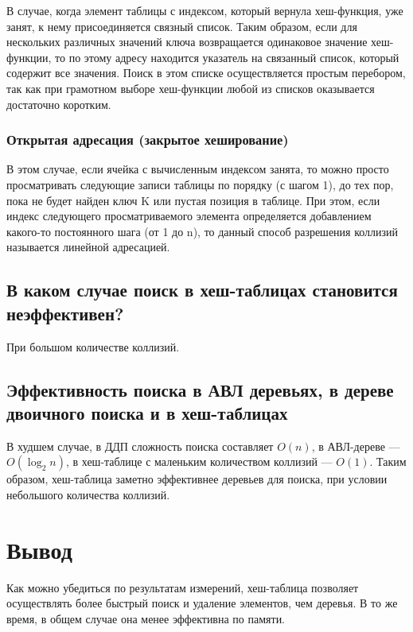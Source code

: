 \documentclass[a4paper,12pt]{extarticle}
\begin{document}
В случае, когда элемент таблицы с индексом, который вернула хеш-функция, уже занят, к нему присоединяется связный список. Таким образом, если для нескольких различных значений ключа возвращается одинаковое значение хеш-функции, то по этому адресу находится указатель на связанный список, который содержит все значения. Поиск в этом списке осуществляется простым перебором, так как при грамотном выборе хеш-функции любой из списков оказывается достаточно коротким.
	
\subsubsection{Открытая адресация (закрытое хеширование)}

В этом случае, если ячейка с вычисленным индексом занята, то можно просто просматривать следующие записи таблицы по порядку (с шагом 1), до тех пор, пока не будет найден ключ K или пустая позиция в таблице. При этом, если индекс следующего просматриваемого элемента определяется добавлением какого-то постоянного шага (от 1 до n), то данный способ разрешения коллизий называется линейной адресацией.

\subsection{В каком случае поиск в хеш-таблицах становится неэффективен?}

При большом количестве коллизий.

\subsection{Эффективность поиска в АВЛ деревьях, в дереве двоичного поиска и в хеш-таблицах}

В худшем случае, в ДДП сложность поиска составляет $O(n)$, в АВЛ-дереве --- $O(\log_2 n)$, в хеш-таблице с маленьким количеством коллизий --- $O(1)$. Таким образом, хеш-таблица заметно эффективнее деревьев для поиска, при условии небольшого количества коллизий.

\newpage

\section{Вывод}

Как можно убедиться по результатам измерений, хеш-таблица
 позволяет осуществлять более быстрый поиск и удаление элементов, чем деревья. В то же время, в общем случае она менее эффективна по памяти. 
 
\end{document}
